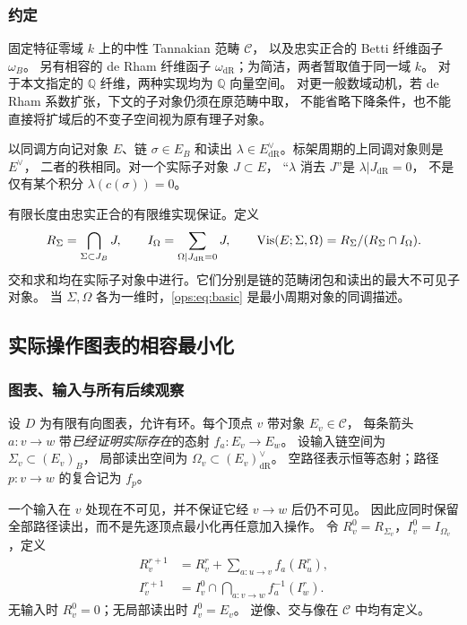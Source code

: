 \documentclass[11pt,a4paper,oneside]{ctexart}
\theoremstyle{cnplain}
\theoremstyle{definition}
\theoremstyle{remark}
\newcommand{\Q}{\mathbb Q}
\newcommand{\dR}{\mathrm{dR}}
\numberwithin{equation}{section}
\begin{document}
\subsubsection{约定}
固定特征零域 $k$ 上的中性 Tannakian 范畴 $\mathcal C$，
以及忠实正合的 Betti 纤维函子 $\omega_B$。
另有相容的 de Rham 纤维函子 $\omega_{\dR}$；为简洁，两者暂取值于同一域 $k$。
对于本文指定的 $\Q$ 纤维，两种实现均为 $\Q$ 向量空间。
对更一般数域动机，若 de Rham 系数扩张，下文的子对象仍须在原范畴中取，
不能省略下降条件，也不能直接将扩域后的不变子空间视为原有理子对象。

以同调方向记对象 $E$、链 $\sigma\in E_B$ 和读出
$\lambda\in E_{\dR}^{\vee}$。标架周期的上同调对象则是 $E^\vee$，
二者的秩相同。对一个实际子对象 $J\subset E$，
``$\lambda$ 消去 $J$''是 $\lambda|J_{\dR}=0$，
不是仅有某个积分 $\lambda(c(\sigma))=0$。

有限长度由忠实正合的有限维实现保证。定义
\begin{equation}\label{ops:eq:basic}
 R_\Sigma=\bigcap_{\Sigma\subset J_B}J,
 \qquad I_\Omega=\sum_{\Omega|J_{\dR}=0}J,
 \qquad \Vis(E;\Sigma,\Omega)=R_\Sigma/(R_\Sigma\cap I_\Omega).
\end{equation}
交和求和均在实际子对象中进行。它们分别是链的范畴闭包和读出的最大不可见子对象。
当 $\Sigma,\Omega$ 各为一维时，\eqref{ops:eq:basic} 是最小周期对象的同调描述。


\subsection{实际操作图表的相容最小化}
\subsubsection{图表、输入与所有后续观察}
设 $D$ 为有限有向图表，允许有环。每个顶点 $v$ 带对象 $E_v\in\mathcal C$，
每条箭头 $a:v\to w$ 带\emph{已经证明实际存在}的态射 $f_a:E_v\to E_w$。
设输入链空间为 $\Sigma_v\subset(E_v)_B$，
局部读出空间为 $\Omega_v\subset(E_v)_{\dR}^{\vee}$。
空路径表示恒等态射；路径 $p:v\to w$ 的复合记为 $f_p$。

一个输入在 $v$ 处现在不可见，并不保证它经 $v\to w$ 后仍不可见。
因此应同时保留全部路径读出，而不是先逐顶点最小化再任意加入操作。
令 $R_v^0=R_{\Sigma_v}$，$I_v^0=I_{\Omega_v}$，定义
\begin{align}
 R_v^{r+1}&=R_v^r+\sum_{a:u\to v}f_a(R_u^r),\label{ops:eq:Riter}\\
 I_v^{r+1}&=I_v^0\cap\bigcap_{a:v\to w}f_a^{-1}(I_w^r).
 \label{ops:eq:Iiter}
\end{align}
无输入时 $R_v^0=0$；无局部读出时 $I_v^0=E_v$。
逆像、交与像在 $\mathcal C$ 中均有定义。
\end{document}
